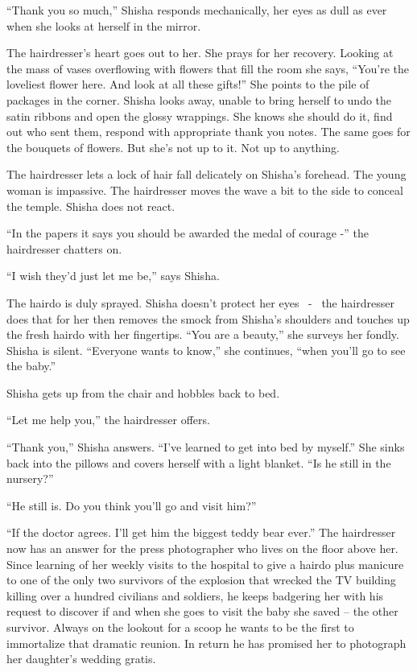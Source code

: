 \documentclass[twoside,11pt]{book}
\begin{document}
``Thank you so much,'' Shisha responds mechanically, her eyes as dull as ever when she looks
at herself in the mirror.

The hairdresser's heart goes out to her. She prays for her recovery. Looking at the mass of vases overflowing with
flowers that fill the room she says, ``You're the loveliest flower here. And look at all these
gifts!'' She points to the pile of packages in the corner. Shisha looks away, unable to bring herself to
undo the satin ribbons and open the glossy wrappings. She knows she should do it, find out who sent them, respond
with appropriate thank you notes. The same goes for the bouquets of flowers. But she's not up to it. Not up to
anything.

The hairdresser lets a lock of hair fall delicately on Shisha's forehead. The young woman is impassive. The hairdresser
moves the wave a bit to the side to conceal the temple. Shisha does not react.{
}\

``In the papers it says you should be awarded the medal of courage -'' the hairdresser
chatters on.

``I wish they'd just let me be,'' says Shisha{.}

The hairdo is duly sprayed. Shisha doesn't protect{ }her eyes
\ {{}- }\ the hairdresser does that for her then removes the smock from
Shisha's shoulders and touches up the fresh hairdo with her fingertips. ``You are a beauty,''
she surveys her fondly. Shisha is silent. ``Everyone wants to know,'' she continues, ``when you'll go to
see the baby.''

Shisha gets up from the chair and hobbles back to bed.

``Let me help you,'' the hairdresser offers.

``Thank you,'' Shisha answers. ``I've learned to get into bed by
myself.'' She sinks back into the pillows and covers herself with a light blanket. ``Is he
still in the nursery?'' \

``He still is. Do you think you'll go and visit him?''

``If the doctor agrees. I'll get him the biggest teddy bear ever.'' The hairdresser now has an
answer for the press photographer who lives on the floor above her. Since learning of her weekly visits to the hospital
to give a hairdo plus manicure to one of the only two survivors of the explosion that wrecked the TV building killing
over a hundred civilians and soldiers, he keeps badgering her with his request to discover if and when she goes to
visit the baby she saved -- the other survivor. Always on the lookout for a scoop he wants to be the first to
immortalize that dramatic reunion. In return he has promised her to photograph her daughter's wedding gratis.
\end{document}
